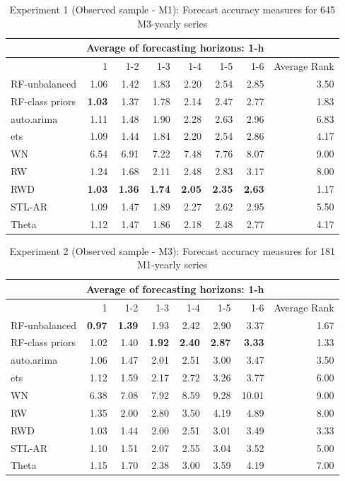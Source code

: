 \documentclass[11pt,]{article}
\theoremstyle{definition}
\theoremstyle{definition}
\theoremstyle{definition}
\theoremstyle{remark}
\begin{document}
\begin{table}[!h]
\centering
\caption{Experiment 1 (Observed sample - M1): Forecast accuracy measures for 645 M3-yearly series}
\label{YM3}
\begin{tabular}{lrrrrrrr}
\hline
 & \multicolumn{6}{c}{Average of forecasting horizons: 1-h} \\ \hline
 & 1  & 1-2  & 1-3  & 1-4 & 1-5 & 1-6 & Average Rank \\ \hline
 RF-unbalanced & 1.06  &  1.42 & 1.83  & 2.20 & 2.54 & 2.85 & 3.50 \\ 
 RF-class priors& \bf{1.03}  & 1.37  & 1.78  & 2.14 & 2.47 & 2.77 & 1.83 \\ 
auto.arima &  1.11 & 1.48  & 1.90  & 2.28 & 2.63 & 2.96 & 6.83 \\ 
ets&   1.09  & 1.44  & 1.84 & 2.20 & 2.54 & 2.86 & 4.17\\ 
WN&    6.54  & 6.91  & 7.22 & 7.48 &7.76  & 8.07 & 9.00\\ 
RW &    1.24  & 1.68  & 2.11 & 2.48 & 2.83 & 3.17 &8.00 \\ 
RWD&   \bf{1.03}  & \bf{1.36}  & \bf{1.74} & \bf{2.05} & \bf{2.35} & \bf{2.63} &1.17 \\ 
STL-AR & 1.09  &  1.47 &  1.89 & 2.27 & 2.62 & 2.95 & 5.50 \\ 
Theta & 1.12  & 1.47  & 1.86  & 2.18 & 2.48 & 2.77 & 4.17 \\ \hline
\end{tabular}
\end{table}

\newpage

\begin{table}[!h]
\centering
\caption{Experiment 2 (Observed sample - M3): Forecast accuracy measures for 181 M1-yearly series}
\label{YM1}
\begin{tabular}{lrrrrrrr}
\hline
 & \multicolumn{6}{c}{Average of forecasting horizons: 1-h} \\ \hline
 & 1  & 1-2  & 1-3  & 1-4 & 1-5 & 1-6 & Average Rank \\ \hline
 RF-unbalanced & \bf{0.97}  & \bf{1.39}  & 1.93  & 2.42 & 2.90 & 3.37 & 1.67 \\ 
 RF-class priors& 1.02  & 1.40 &  \bf{1.92} & \bf{2.40} & \bf{2.87}  & \bf{3.33} &1.33  \\ 
auto.arima &  1.06 & 1.47  & 2.01  & 2.51 & 3.00 & 3.47 & 3.50 \\ 
ets&   1.12  & 1.59  & 2.17 & 2.72 & 3.26 &3.77  & 6.00\\ 
WN&    6.38  & 7.08  & 7.92 & 8.59 & 9.28 & 10.01 & 9.00\\ 
RW &    1.35  & 2.00  & 2.80 & 3.50 & 4.19 & 4.89 & 8.00\\ 
RWD&    1.03  & 1.44  & 2.00 & 2.51 & 3.01 & 3.49 & 3.33 \\ 
STL-AR & 1.10 &  1.51 &  2.07 & 2.55 & 3.04 & 3.52 & 5.00 \\ 
Theta & 1.15  & 1.70  & 2.38  & 3.00 & 3.59 & 4.19 & 7.00 \\ \hline
\end{tabular}
\end{table}
\end{document}
